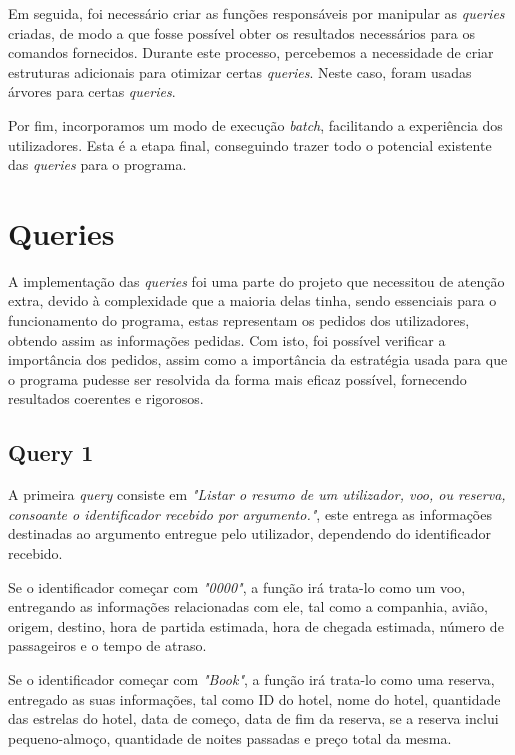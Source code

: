\documentclass[a4paper,12pt]{scrreprt}
\begin{document}
Em seguida, foi necessário criar as funções responsáveis por manipular as \textit{queries} criadas, de modo a que fosse possível obter os resultados necessários para os comandos fornecidos. Durante este processo, percebemos a necessidade de criar estruturas adicionais para otimizar certas \textit{queries}. Neste caso, foram usadas árvores para certas \textit{queries}.

Por fim, incorporamos um modo de execução \textit{batch}, facilitando a experiência dos utilizadores. Esta é a etapa final, conseguindo trazer todo o potencial existente das \textit{queries} para o programa.

\section{Queries}

A implementação das \textit{queries} foi uma parte do projeto que necessitou de atenção extra, devido à complexidade que a maioria delas tinha, sendo essenciais para o funcionamento do programa, estas representam os pedidos dos utilizadores, obtendo assim as informações pedidas. Com isto, foi possível verificar a importância dos pedidos, assim como a importância da estratégia usada para que o programa pudesse ser resolvida da forma mais eficaz possível, fornecendo resultados coerentes e rigorosos.

\subsection{Query 1}

A primeira \textit{query} consiste em \textit{"Listar o resumo de um utilizador, voo, ou reserva, consoante o identificador recebido por argumento."}, este entrega as informações destinadas ao argumento entregue pelo utilizador, dependendo do identificador recebido. 

Se o identificador começar com \textit{"0000"}, a função irá trata-lo como um voo, entregando as informações relacionadas com ele, tal como a companhia, avião, origem, destino, hora de partida estimada, hora de chegada estimada, número de passageiros e o tempo de atraso.

Se o identificador começar com \textit{"Book"}, a função irá trata-lo como uma reserva, entregado as suas informações, tal como ID do hotel, nome do hotel, quantidade das estrelas do hotel, data de começo, data de fim da reserva, se a reserva inclui pequeno-almoço, quantidade de noites passadas e preço total da mesma.
\end{document}
